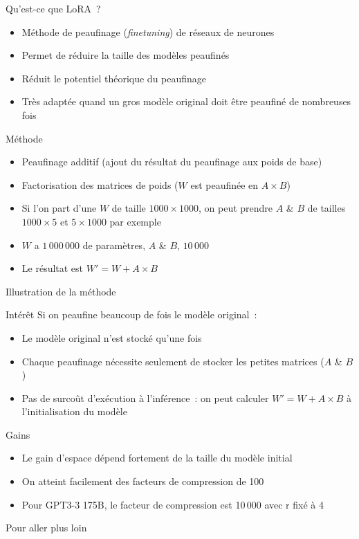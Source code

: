 \begin{frame}{Qu'est-ce que LoRA~?}
  \begin{itemize}
    \item Méthode de peaufinage (\textit{finetuning}) de réseaux de neurones
    \item Permet de réduire la taille des modèles peaufinés
    \item Réduit le potentiel théorique du peaufinage
    \item Très adaptée quand un gros modèle original doit être peaufiné de nombreuses fois
  \end{itemize}
\end{frame}

\begin{frame}{Méthode}
  \begin{itemize}
    \item Peaufinage additif (ajout du résultat du peaufinage aux poids de base)
    \item Factorisation des matrices de poids ($W$ est peaufinée en $A \times B$)
    \item Si l'on part d'une $W$ de taille $1000 \times 1000$, on peut prendre $A$ \& $B$ de tailles $1000 \times 5$ et $5 \times 1000$ par exemple
    \item $W$ a $1\,000\,000$ de paramètres, $A$ \& $B$, $10\,000$
    \item Le résultat est $W' = W + A \times B$
  \end{itemize}
\end{frame}

\begin{frame}{Illustration de la méthode}
\end{frame}

\begin{frame}{Intérêt}
  Si on peaufine beaucoup de fois le modèle original~:
  \begin{itemize}
    \item Le modèle original n'est stocké qu'une fois
    \item Chaque peaufinage nécessite seulement de stocker les petites matrices ($A$ \& $B$)
    \item Pas de surcoût d'exécution à l'inférence~: on peut calculer $W' = W + A \times B$ à l'initialisation du modèle
  \end{itemize}
\end{frame}

\begin{frame}{Gains}
  \begin{itemize}
    \item Le gain d'espace dépend fortement de la taille du modèle initial
    \item On atteint facilement des facteurs de compression de 100
    \item Pour GPT3-3 175B, le facteur de compression est 10$\,$000 avec r fixé à 4
  \end{itemize}
\end{frame}

\begin{frame}{Pour aller plus loin}
\end{frame}
